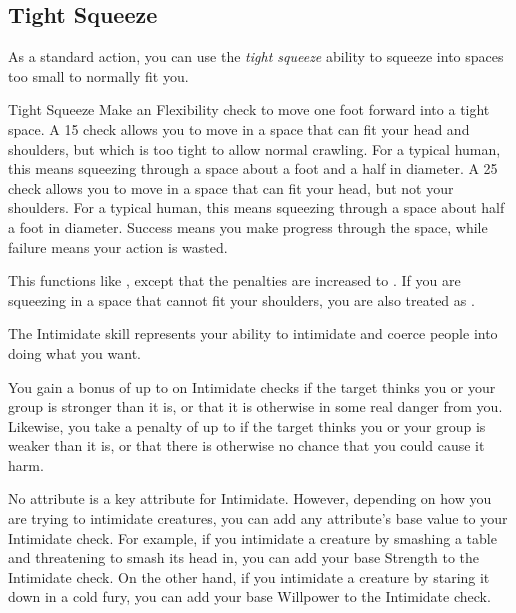     \subsection{Tight Squeeze}
        As a standard action, you can use the \textit{tight squeeze} ability to squeeze into spaces too small to normally fit you.
        \begin{freeability}{Tight Squeeze}
            Make an Flexibility check to move one foot forward into a tight space.
            A  15 check allows you to move in a space that can fit your head and shoulders, but which is too tight to allow normal crawling.
            For a typical human, this means squeezing through a space about a foot and a half in diameter.
            A  25 check allows you to move in a space that can fit your head, but not your shoulders.
            For a typical human, this means squeezing through a space about half a foot in diameter.
            Success means you make progress through the space, while failure means your action is wasted.

            This functions like \squeezing, except that the penalties are increased to .
            If you are squeezing in a space that cannot fit your shoulders, you are also treated as \helpless.
        \end{freeability}

\newpage
{}
    The Intimidate skill represents your ability to intimidate and coerce people into doing what you want.

        You gain a bonus of up to  on Intimidate checks if the target thinks you or your group is stronger than it is, or that it is otherwise in some real danger from you.
        Likewise, you take a penalty of up to  if the target thinks you or your group is weaker than it is, or that there is otherwise no chance that you could cause it harm.

        No attribute is a key attribute for Intimidate.
        However, depending on how you are trying to intimidate creatures, you can add any attribute's base value to your Intimidate check.
        For example, if you intimidate a creature by smashing a table and threatening to smash its head in, you can add your base Strength to the Intimidate check.
        On the other hand, if you intimidate a creature by staring it down in a cold fury, you can add your base Willpower to the Intimidate check.

